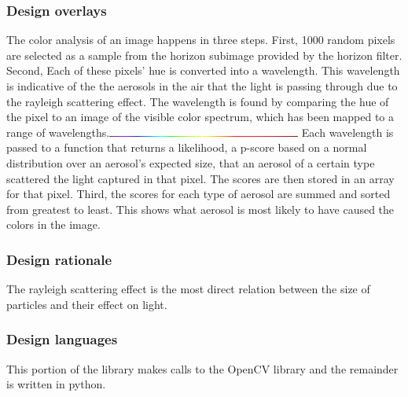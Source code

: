 \documentclass[onecolumn, draftclsnofoot,10pt, compsoc]{IEEEtran}
\begin{document}
\begin{singlespace}
      \subsubsection{Design overlays}
		The color analysis of an image happens in three steps.
		First, 1000 random pixels are selected as a sample from the horizon subimage provided by the horizon filter.
		Second, Each of these pixels' hue is converted into a wavelength.
		This wavelength is indicative of the the aerosols in the air that the light is passing through due to the rayleigh scattering effect.
		The wavelength is found by comparing the hue of the pixel to an image of the visible color spectrum, which has been mapped to a range of wavelengths.\includegraphics[width=2.5in,natwidth=400,natheight=1]{images/Spectrum1pixel.png}
		Each wavelength is passed to a function that returns a likelihood, a p-score based on a normal distribution over an aerosol's expected size, that an aerosol of a certain type scattered the light captured in that pixel.
		The scores are then stored in an array for that pixel.
		Third, the scores for each type of aerosol are summed and sorted from greatest to least.
		This shows what aerosol is most likely to have caused the colors in the image.
      \subsubsection{Design rationale}
		The rayleigh scattering effect is the most direct relation between the size of particles and their effect on light.
      \subsubsection{Design languages}
		This portion of the library makes calls to the OpenCV library and the remainder is written in python.

\end{singlespace}
\end{document}
